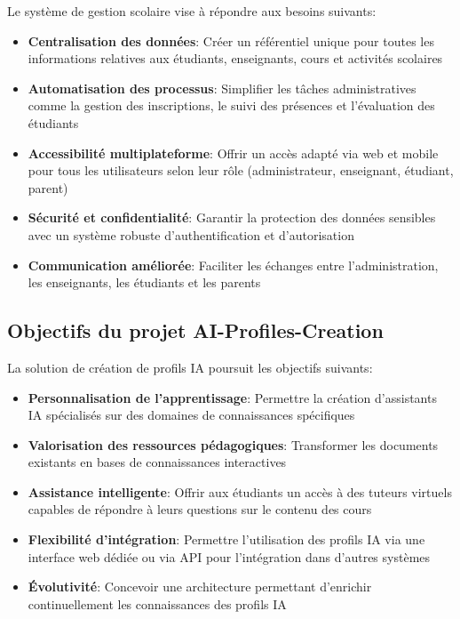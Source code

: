 Le système de gestion scolaire vise à répondre aux besoins suivants:

\begin{itemize}
  \item \textbf{Centralisation des données}: Créer un référentiel unique pour toutes les informations relatives aux étudiants, enseignants, cours et activités scolaires
  
  \item \textbf{Automatisation des processus}: Simplifier les tâches administratives comme la gestion des inscriptions, le suivi des présences et l'évaluation des étudiants
  
  \item \textbf{Accessibilité multiplateforme}: Offrir un accès adapté via web et mobile pour tous les utilisateurs selon leur rôle (administrateur, enseignant, étudiant, parent)
  
  \item \textbf{Sécurité et confidentialité}: Garantir la protection des données sensibles avec un système robuste d'authentification et d'autorisation
  
  \item \textbf{Communication améliorée}: Faciliter les échanges entre l'administration, les enseignants, les étudiants et les parents
\end{itemize}

\subsection{Objectifs du projet AI-Profiles-Creation}

La solution de création de profils IA poursuit les objectifs suivants:

\begin{itemize}
  \item \textbf{Personnalisation de l'apprentissage}: Permettre la création d'assistants IA spécialisés sur des domaines de connaissances spécifiques
  
  \item \textbf{Valorisation des ressources pédagogiques}: Transformer les documents existants en bases de connaissances interactives
  
  \item \textbf{Assistance intelligente}: Offrir aux étudiants un accès à des tuteurs virtuels capables de répondre à leurs questions sur le contenu des cours
  
  \item \textbf{Flexibilité d'intégration}: Permettre l'utilisation des profils IA via une interface web dédiée ou via API pour l'intégration dans d'autres systèmes
  
  \item \textbf{Évolutivité}: Concevoir une architecture permettant d'enrichir continuellement les connaissances des profils IA
\end{itemize}


